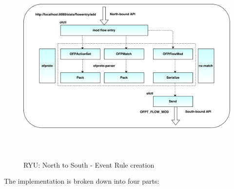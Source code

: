 \begin{figure}[H]
	\centering
	\caption{RYU: North to South - Event Rule creation}
	\includegraphics[height=10cm,width=14cm]{ryu01.pdf}
\end{figure}
The implementation is broken down into four parts:
